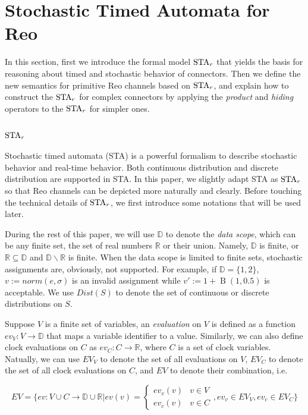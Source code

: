 \section{Stochastic Timed Automata for Reo}
\label{sec:semantics}

In this section, first we introduce the formal model $\mbox{STA}_r$ that yields the basis for reasoning about timed and stochastic behavior of connectors. Then we define the new semantics for primitive Reo channels based on $\mbox{STA}_r$, and explain how to construct the $\mbox{STA}_r$ for complex connectors by applying the \emph{product} and \emph{hiding} operators to the $\mbox{STA}_r$ for simpler ones.
\subsection{$\mbox{STA}_r$}

Stochastic timed automata (STA) \cite{HahnHH14} is a powerful formalism to describe stochastic behavior and real-time behavior. Both continuous distribution and discrete distribution are supported in STA. In this paper, we slightly adapt STA as $\mbox{STA}_r$ so that Reo channels can be depicted more naturally and clearly.
Before touching the technical details of $\mbox{STA}_r$, we first introduce some notations that will be used later.

During the rest of this paper, we will use $\mathbb{D}$ to denote the \emph{data scope}, which can be any finite set, the set of real numbers $\mathbb{R}$ or their union. Namely, $\mathbb{D}$ is finite, or $\mathbb{R}\subseteq \mathbb{D}$ and $\mathbb{D}\backslash \mathbb{R}$ is finite. When the data scope is limited to finite sets, stochastic assignments are, obviously, not supported. For example, if $\mathbb{D}=\{1,2\}$, $v:=norm(e,\sigma)$ is an invalid assignment while $v':=1+\operatorname{B}(1, 0.5)$ is acceptable. We use $Dist(S)$ to denote the set of continuous or discrete distributions on $S$.

\begin{definition}[Evaluations]
Suppose $V$ is a finite set of variables, an \emph{evaluation} on $V$ is defined as a function $ev_V:V\rightarrow \mathbb{D}$ that maps a variable identifier to a value. Similarly, we can also define clock evaluations on $C$ as $ev_C:C\rightarrow \mathbb{R}$, where $C$ is a set of clock variables. Natually, we can use $EV_V$ to denote the set of all evaluations on $V$, $EV_C$ to denote the set of all clock evaluations on $C$, and $EV$ to denote their combination, i.e. 

\begin{displaymath}
    EV=\Bigg\{ev:V\cup C\rightarrow \mathbb{D}\cup\mathbb{R}|
    ev(v)=
    \left\{
        \begin{array}{lr}
            ev_v(v) & v\in V \\
            ev_c(v) & v\in C
        \end{array}
    \right.
    , ev_v\in EV_V, ev_c\in EV_C
    \Bigg\}
\end{displaymath}

\end{definition}

